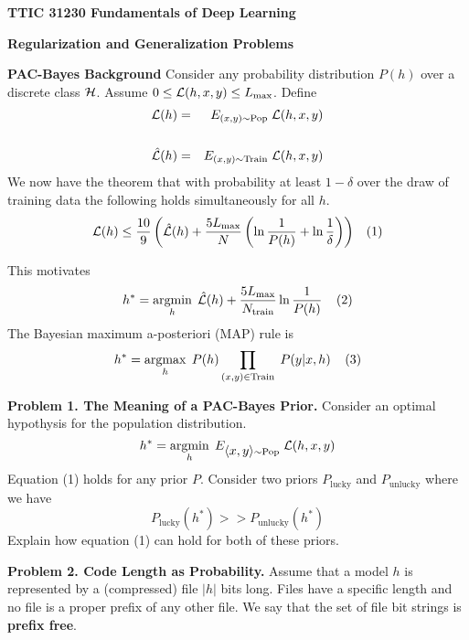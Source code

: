 \documentclass{article}
\newcommand{\solution}[1]{}
\begin{document}
\centerline{\bf TTIC 31230 Fundamentals of Deep Learning}
\bigskip
\centerline{\bf Regularization and  Generalization Problems}

\bigskip
{\bf PAC-Bayes Background} Consider any probability distribution $P(h)$ over a discrete class ${\cal H}$.
Assume $0 \leq {\cal L}(h,x,y) \leq L_{\max}$. Define
\begin{eqnarray*}
{\cal L}(h)  & = &  E_{(x,y)\sim \mathrm{Pop}}\;{\cal L}(h,x,y) \\
\\
\hat{{\cal L}}(h) & = & E_{(x,y)\sim \mathrm{Train}}\;{\cal L}(h,x,y)
\end{eqnarray*}
We now have the theorem that with probability
at least $1-\delta$ over the draw of training data the following holds simultaneously for all $h$.
$${\cal L}(h) \leq \frac{10}{9}\left(\hat{\cal L}(h) + \frac{5 L_\mathrm{max}}{N}\left(\ln \frac{1}{P(h)} + \ln\frac{1}{\delta}\right)\right) \;\;\;(1)$$

This motivates
$$h^* = \operatorname*{argmin}_h \;\hat{{\cal L}}(h) + \frac{5L_{\max}}{N_{\mathrm{train}}} \ln\frac{1}{P(h)}\;\;\;\;(2)$$
The Bayesian maximum a-posteriori (MAP) rule is
$$h^* = \operatorname*{argmax}_h\;P(h)\prod_{(x,y) \in \mathrm{Train}}\;P(y|x,h)\;\;\;\;(3)$$

\medskip
{\bf Problem 1. The Meaning of a PAC-Bayes Prior.}  Consider an optimal hypothysis for the population distribution.
$$h^* = \operatorname*{argmin}_h\;E_{{\mbox{$\langle x,y\rangle$}} \sim \mathrm{Pop}}\;{\cal L}(h,x,y)$$
Equation (1) holds for any prior $P$.  Consider two priors $P_{\mathrm{lucky}}$ and $P_{\mathrm{unlucky}}$ where we have
$$P_{\mathrm{lucky}}(h^*) >> P_{\mathrm{unlucky}}(h^*)$$
Explain how equation (1) can hold for both of these priors.

\solution{
  The prior $P$ should be interpreted as saying which hyopthesis will be measured accurately first as $N_{\mathrm{train}}$ increases.
  We can interpret $P$ as a ``guess'' as to where we think the good hypotheses are.
  The prior $P$ is not stating any actual propability of where the optimal hypothesis is.
  We get accurate measurements first
  for the hypotheses $h$ for which $P(h)$ is large.
  For $P_{\mathrm{unlucky}}$ we get an accurate measureent of ${\cal L}(h^*)$ only much later than we do under $P_{\mathrm{lucky}}$.
}

\medskip
{\bf Problem 2. Code Length as Probability.}
Assume that a model $h$ is represented by a (compressed) file $|h|$ bits long.  Files have a specific length and no file is a proper prefix of any other file.
We say that the set of file bit strings is {\bf prefix free}.
\end{document}
